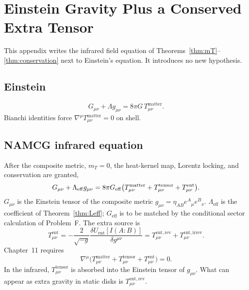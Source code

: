 \chapter{Einstein Gravity Plus a Conserved Extra Tensor}
\label{app:field-eq}

This appendix writes the infrared field equation of
Theorems~\ref{thm:mT}--\ref{thm:conservation} next to
Einstein's equation. It introduces no new hypothesis.

\section{Einstein}
\begin{equation}
  \label{eq:appF-Ein}
  G_{\mu\nu}+\Lambda g_{\mu\nu}
  =8\pi G\,T_{\mu\nu}^{\mathrm{matter}}.
\end{equation}
Bianchi identities force
\(\nabla^\mu T_{\mu\nu}^{\mathrm{matter}}=0\) on shell.

\section{NAMCG infrared equation}
After the composite metric, \(m_T=0\), the heat-kernel map,
Lorentz locking, and conservation are granted,
\begin{equation}
  \label{eq:appF-NAMCG}
  G_{\mu\nu}+\Lambda_{\mathrm{eff}}g_{\mu\nu}
  =8\pi G_{\mathrm{eff}}
  \bigl(
    T_{\mu\nu}^{\mathrm{matter}}
   +T_{\mu\nu}^{\mathrm{tensor}}
   +T_{\mu\nu}^{\mathrm{ent}}
  \bigr).
\end{equation}
\(G_{\mu\nu}\) is the Einstein tensor of the composite metric
\(g_{\mu\nu}=\eta_{AB}e^A{}_\mu e^B{}_\nu\).
\(\Lambda_{\mathrm{eff}}\) is the coefficient of
Theorem~\ref{thm:Leff}; \(G_{\mathrm{eff}}\) is to be matched by the
conditional sector calculation of Problem~F.
The extra source is
\begin{equation}
  \label{eq:appF-Tent}
  T_{\mu\nu}^{\mathrm{ent}}
  =-\frac{2}{\sqrt{-g}}
   \frac{\delta U_{\mathrm{ent}}[I(A:B)]}{\delta g^{\mu\nu}}
  =T_{\mu\nu}^{\mathrm{ent,rev}}
   +T_{\mu\nu}^{\mathrm{ent,irrev}}.
\end{equation}
Chapter~11 requires
\begin{equation}
  \label{eq:appF-cons}
  \nabla^\mu
  \bigl(
    T_{\mu\nu}^{\mathrm{matter}}
   +T_{\mu\nu}^{\mathrm{tensor}}
   +T_{\mu\nu}^{\mathrm{ent}}
  \bigr)
  =0.
\end{equation}
In the infrared, \(T_{\mu\nu}^{\mathrm{tensor}}\) is absorbed
into the Einstein tensor of \(g_{\mu\nu}\). What can appear
as extra gravity in static disks is
\(T_{\mu\nu}^{\mathrm{ent,rev}}\).

